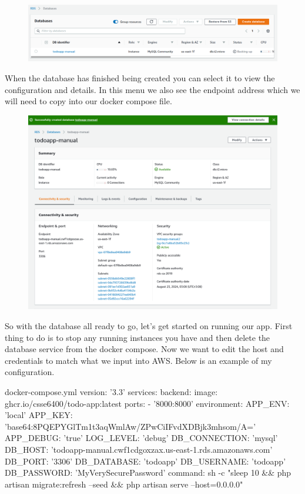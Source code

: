\documentclass{csse4400}
\begin{document}
\begin{figure}[H]
  \includegraphics[width=\textwidth]{images/aws_4}
\end{figure}

When the database has finished being created you can select it to view the configuration and details.
In this menu we also see the endpoint address which we will need to copy into our docker compose file.

\begin{figure}[H]
  \includegraphics[width=\textwidth]{images/aws_5}
\end{figure}

So with the database all ready to go, let's get started on running our app.
First thing to do is to stop any running instances you have and then delete the database service from the docker compose.
Now we want to edit the host and credentials to match what we input into AWS.
Below is an example of my configuration.

\begin{code}[language=docker-compose]{docker-compose.yml}
  version: '3.3'
  services:
    backend:
      image: ghcr.io/csse6400/todo-app:latest
      ports:
        - '8000:8000'
      environment:
        APP_ENV: 'local'
        APP_KEY: 'base64:8PQEPYGlTm1t3aqWmlAw/ZPwCiIFvdXDBjk3mhsom/A='
        APP_DEBUG: 'true'
        LOG_LEVEL: 'debug'
        DB_CONNECTION: 'mysql'
        DB_HOST: 'todoapp-manual.cwf1cdgoxzax.us-east-1.rds.amazonaws.com'
        DB_PORT: '3306'
        DB_DATABASE: 'todoapp'
        DB_USERNAME: 'todoapp'
        DB_PASSWORD: 'MyVerySecurePassword'
      command: sh -c "sleep 10 && php artisan migrate:refresh --seed && php artisan serve --host=0.0.0.0"
\end{code}
\end{document}
